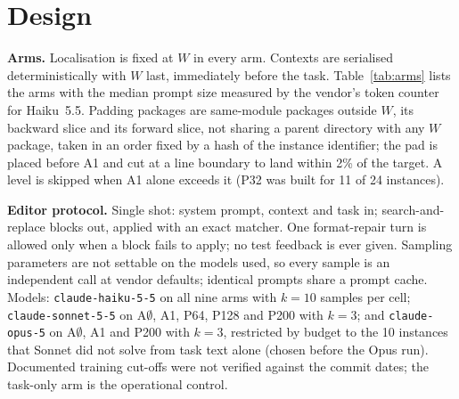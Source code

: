 \documentclass[10pt]{article}
\begin{document}
\section{Design}

\textbf{Arms.} Localisation is fixed at $W$ in every arm. Contexts are serialised deterministically with $W$ last, immediately before the task. Table~\ref{tab:arms} lists the arms with the median prompt size measured by the vendor's token counter for Haiku~5.5. Padding packages are same-module packages outside $W$, its backward slice and its forward slice, not sharing a parent directory with any $W$ package, taken in an order fixed by a hash of the instance identifier; the pad is placed before A1 and cut at a line boundary to land within 2\% of the target. A level is skipped when A1 alone exceeds it (P32 was built for 11 of 24 instances).

\begin{table}[t]
\centering\footnotesize
{}
\caption{Arms. System prompt and task are included in the token counts.}
\label{tab:arms}
\end{table}

\textbf{Editor protocol.} Single shot: system prompt, context and task in; search-and-replace blocks out, applied with an exact matcher. One format-repair turn is allowed only when a block fails to apply; no test feedback is ever given. Sampling parameters are not settable on the models used, so every sample is an independent call at vendor defaults; identical prompts share a prompt cache. Models: \texttt{claude-haiku-5-5} on all nine arms with $k=10$ samples per cell; \texttt{claude-sonnet-5-5} on A$\emptyset$, A1, P64, P128 and P200 with $k=3$; and \texttt{claude-opus-5} on A$\emptyset$, A1 and P200 with $k=3$, restricted by budget to the 10 instances that Sonnet did not solve from task text alone (chosen before the Opus run). Documented training cut-offs were not verified against the commit dates; the task-only arm is the operational control.
\end{document}
